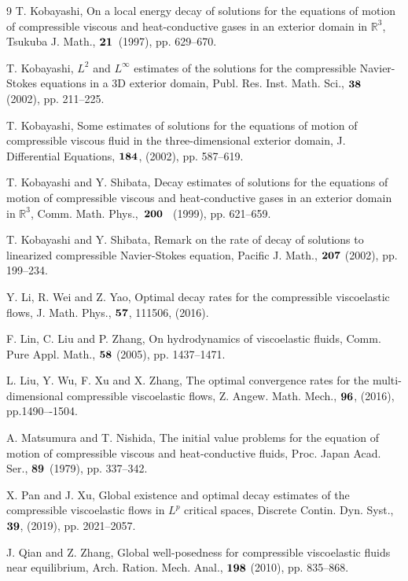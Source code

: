 \documentclass[dvipdfmx,12pt]{article}
\begin{document}
\begin{thebibliography}{9}
 T. Kobayashi, On a local energy decay of solutions for the equations of motion of compressible viscous and heat-conductive gases in an exterior domain in $\mathbb{R}^3$, Tsukuba J. Math., $\bf{21}$~(1997), pp. 629–670.

 T. Kobayashi, $L^2$  and  $L^\infty$  estimates of the solutions for the compressible Navier-Stokes equations in a 3D exterior domain, Publ. Res. Inst. Math. Sci., $\bf{38}$~ (2002), pp. 211–225.

 T. Kobayashi, Some estimates of solutions for the equations of motion of compressible viscous fluid in the three-dimensional exterior domain, J. Differential Equations, $\bf{184}$, (2002), pp. 587–619.

T. Kobayashi and Y. Shibata, Decay estimates of solutions for the equations of motion of compressible viscous and heat-conductive gases in an exterior domain in $\mathbb{R}^3$, Comm. Math. Phys.,~$\bf{200}$~ (1999), pp. 621–659.

T. Kobayashi and Y. Shibata, Remark on the rate of decay of solutions to linearized compressible Navier-Stokes equation, Pacific J. Math., $\bf{207}$ (2002), pp. 199--234.

Y. Li, R. Wei and Z. Yao, Optimal decay rates for the compressible viscoelastic flows, J. Math. Phys., $\bf{57}$, 111506, (2016).

F. Lin, C. Liu and P. Zhang, On hydrodynamics of viscoelastic fluids, Comm. Pure Appl. Math., $\bf{58}$ (2005), pp. 1437--1471.

L. Liu, Y. Wu, F. Xu and X. Zhang, The optimal convergence rates for the multi-dimensional compressible viscoelastic ﬂows, Z. Angew. Math. Mech., $\bf{96}$, (2016), pp.1490–-1504.

A. Matsumura and T. Nishida, The initial value problems for the equation of motion of compressible viscous and heat-conductive fluids, Proc. Japan Acad. Ser., {\bf 89}~(1979), pp. 337--342.

 X. Pan and  J. Xu, Global existence and optimal decay estimates of the compressible viscoelastic flows in $L^p$ critical spaces, Discrete Contin. Dyn. Syst., $\bf{39}$, (2019), pp. 2021--2057.

J. Qian and Z. Zhang, Global well-posedness for compressible viscoelastic fluids near equilibrium, Arch. Ration. Mech. Anal., $\bf{198}$ (2010), pp. 835--868. 


\end{thebibliography}
\end{document}

